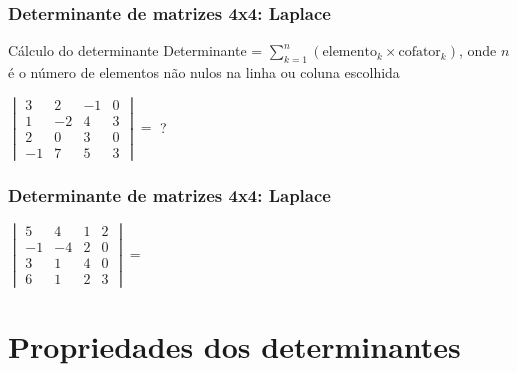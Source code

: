 \documentclass[pdftex, brazil]{beamer}
\begin{document}
\begin{frame}[t]
  \frametitle{Determinante de matrizes 4x4: Laplace}
  \begin{block}{Cálculo do determinante}
    Determinante = $\displaystyle \sum_{k=1}^n (\text{elemento}_k \times \text{cofator}_k)$,
        onde $n$ é o número de elementos não nulos na linha ou coluna escolhida
  \end{block}
  $\begin{vmatrix}
    3 & 2 & -1 & 0\\
    1 & -2 & 4 & 3\\
    2 & 0 & 3 & 0\\
    -1 & 7 & 5 & 3\end{vmatrix} =$ ?
\end{frame}

\begin{frame}[t]
  \frametitle{Determinante de matrizes 4x4: Laplace}
  $\begin{vmatrix}
    5 & 4 & 1 & 2\\
    -1 & -4 & 2 & 0\\
    3 & 1 & 4 & 0\\
    6 & 1 & 2 & 3\end{vmatrix} =$
\end{frame}


\section{Propriedades dos determinantes}
\end{document}
